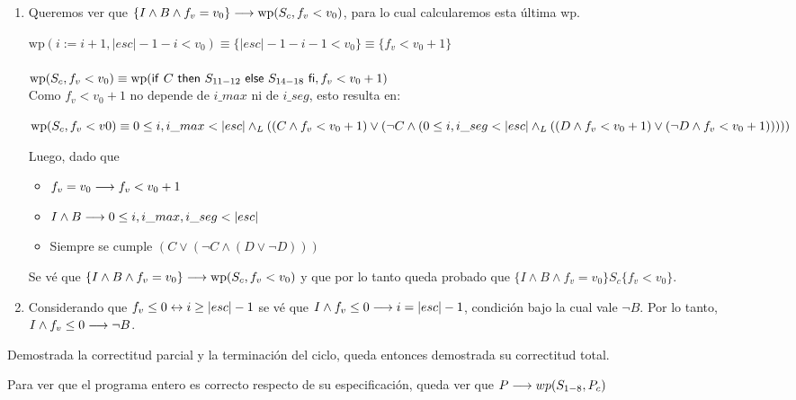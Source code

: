 \documentclass[10pt,a4paper]{article}
\renewcommand{\wp}{\text{wp}}
\begin{document}
\begin{enumerate}
    \item Queremos ver que $\{I \land B \land f_v = v_0\} \implica \wp(S_c, f_v < v_0)$, para lo cual calcularemos esta última wp.
    
    $\wp(i := i + 1, |esc| - 1 - i < v_0) \equiv \{|esc| - 1 - i - 1 < v_0\} \equiv \{f_v < v_0 + 1\}$
    \\\\
    $\wp(S_c, f_v < v_0) \equiv \wp(\IfThenElse{C}{S_{11-12}}{S_{14-18}}, f_v < v_0 + 1)$\\
    Como $f_v < v_0 + 1$ no depende de $i\_max$ ni de $i\_seg$, esto resulta en:
    
    $\wp(S_c, f_v < v0) \equiv 0 \leq i, i\_max < |esc| \yLuego ((C \land f_v < v_0+1) \lor (\neg C \land (0 \leq i, i\_seg < |esc| \yLuego ((D \land f_v < v_0 + 1) \lor (\neg D \land f_v < v_0 + 1)))))$

    Luego, dado que
    \begin{itemize}
        \item $f_v = v_0 \longrightarrow f_v < v_0+1$
        \item $I \land B \longrightarrow 0 \leq i, i\_max, i\_seg < |esc|$
        \item Siempre se cumple $(C \lor (\neg C \land (D \lor \neg D)))$
    \end{itemize}
    Se vé que $\{I \land B \land f_v = v_0\} \implica \wp(S_c, f_v < v_0)$ y que por lo tanto queda probado que $\{I \land B \land f_v = v_0\}S_c\{f_v < v_0\}$.
    \item Considerando que $f_v \leq 0 \leftrightarrow i \geq |esc| - 1$ se vé que $I \land f_v \leq 0 \longrightarrow i = |esc| - 1$, condición bajo la cual vale $\neg B$. Por lo tanto, $I \land f_v \leq 0 \longrightarrow \neg B$.
\end{enumerate}

Demostrada la correctitud parcial y la terminación del ciclo, queda entonces demostrada su correctitud total. 

Para ver que el programa entero es correcto respecto de su especificación, queda ver que $P \longrightarrow wp(S_{1-8}, P_c)$
\end{document}
